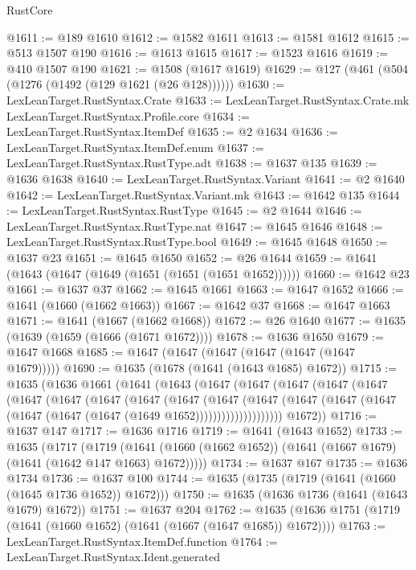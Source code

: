 \begin{lexlean}{RustCore}
\begin{coremodule}
@1611 := @189 @1610
@1612 := @1582 @1611
@1613 := @1581 @1612
@1615 := @513 @1507 @190
@1616 := @1613 @1615
@1617 := @1523 @1616
@1619 := @410 @1507 @190
@1621 := @1508 (@1617 @1619)
@1629 := @127 (@461 (@504 (@1276 (@1492 (@129 @1621 (@26 @128))))))
@1630 := LexLeanTarget.RustSyntax.Crate
@1633 := LexLeanTarget.RustSyntax.Crate.mk LexLeanTarget.RustSyntax.Profile.core
@1634 := LexLeanTarget.RustSyntax.ItemDef
@1635 := @2 @1634
@1636 := LexLeanTarget.RustSyntax.ItemDef.enum
@1637 := LexLeanTarget.RustSyntax.RustType.adt
@1638 := @1637 @135
@1639 := @1636 @1638
@1640 := LexLeanTarget.RustSyntax.Variant
@1641 := @2 @1640
@1642 := LexLeanTarget.RustSyntax.Variant.mk
@1643 := @1642 @135
@1644 := LexLeanTarget.RustSyntax.RustType
@1645 := @2 @1644
@1646 := LexLeanTarget.RustSyntax.RustType.nat
@1647 := @1645 @1646
@1648 := LexLeanTarget.RustSyntax.RustType.bool
@1649 := @1645 @1648
@1650 := @1637 @23
@1651 := @1645 @1650
@1652 := @26 @1644
@1659 := @1641 (@1643 (@1647 (@1649 (@1651 (@1651 (@1651 @1652))))))
@1660 := @1642 @23
@1661 := @1637 @37
@1662 := @1645 @1661
@1663 := @1647 @1652
@1666 := @1641 (@1660 (@1662 @1663))
@1667 := @1642 @37
@1668 := @1647 @1663
@1671 := @1641 (@1667 (@1662 @1668))
@1672 := @26 @1640
@1677 := @1635 (@1639 (@1659 (@1666 (@1671 @1672))))
@1678 := @1636 @1650
@1679 := @1647 @1668
@1685 := @1647 (@1647 (@1647 (@1647 (@1647 (@1647 @1679)))))
@1690 := @1635 (@1678 (@1641 (@1643 @1685) @1672))
@1715 := @1635
    (@1636
      @1661
      (@1641
        (@1643
          (@1647
            (@1647
              (@1647
                (@1647
                  (@1647
                    (@1647
                      (@1647
                        (@1647
                          (@1647
                            (@1647
                              (@1647
                                (@1647
                                  (@1647
                                    (@1647
                                      (@1647 (@1647 (@1647 (@1647 (@1649 @1652))))))))))))))))))))
        @1672))
@1716 := @1637 @147
@1717 := @1636 @1716
@1719 := @1641 (@1643 @1652)
@1733 := @1635
    (@1717
      (@1719 (@1641 (@1660 (@1662 @1652)) (@1641 (@1667 @1679) (@1641 (@1642 @147 @1663) @1672)))))
@1734 := @1637 @167
@1735 := @1636 @1734
@1736 := @1637 @100
@1744 := @1635 (@1735 (@1719 (@1641 (@1660 (@1645 @1736 @1652)) @1672)))
@1750 := @1635 (@1636 @1736 (@1641 (@1643 @1679) @1672))
@1751 := @1637 @204
@1762 := @1635 (@1636 @1751 (@1719 (@1641 (@1660 @1652) (@1641 (@1667 (@1647 @1685)) @1672))))
@1763 := LexLeanTarget.RustSyntax.ItemDef.function
@1764 := LexLeanTarget.RustSyntax.Ident.generated

\end{coremodule}
\end{lexlean}
